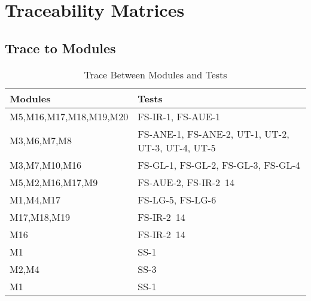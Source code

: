 \documentclass[12pt]{article}
\begin{document}
		
		
\section{Traceability Matrices}

\subsection{Trace to Modules}

\begin{table}[!htbp]
      \begin{tabular}{ll}
        \toprule
        Modules & Tests \\
        \midrule
        M5,M16,M17,M18,M19,M20 & FS-IR-1, FS-AUE-1 \\
        M3,M6,M7,M8 & FS-ANE-1, FS-ANE-2, UT-1, UT-2, UT-3, UT-4, UT-5\\
        M3,M7,M10,M16 & FS-GL-1, FS-GL-2, FS-GL-3, FS-GL-4 \\
        M5,M2,M16,M17,M9 & FS-AUE-2, FS-IR-2~14 \\
        M1,M4,M17 & FS-LG-5, FS-LG-6 \\
        M17,M18,M19 & FS-IR-2~14  \\
        M16 & FS-IR-2~14 \\
        M1 & SS-1  \\
        M2,M4 & SS-3 \\
        M1 & SS-1  \\
        
        \bottomrule
        \end{tabular}
        \caption{Trace Between Modules and Tests}
        \makeatletter
           \def\rulecolor#1#{\CT@arc{#1}}
           \def\CT@arc#1#2{%
           \ifdim\baselineskip=\z@\noalign\fi
           {\gdef\CT@arc@{\color#1{#2}}}}
           \let\CT@arc@\relax
        \makeatother
        \label{Table 2}
        \end{table}
\end{document}
